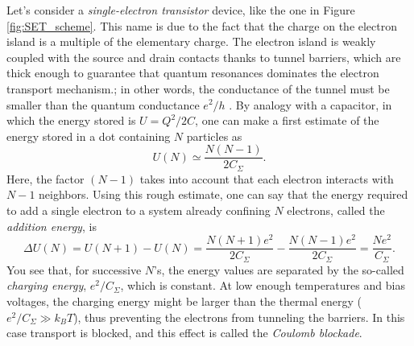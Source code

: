 \documentclass[a4paper,twoside,11pt]{book}
\begin{document}
Let's consider a \emph{single-electron transistor} device, like the one in Figure \ref{fig:SET_scheme}. This name is due to the fact that the charge on the electron island is a multiple of the elementary charge. The electron island is weakly coupled with the source and drain contacts thanks to tunnel barriers, which are thick enough to guarantee that quantum resonances dominates the electron transport mechanism.; in other words, the conductance of the tunnel must be smaller than the quantum conductance $e^2/h$ \citep[see][]{Reimann2002}. By analogy with a capacitor, in which the energy stored is $U=Q^2/2C$, one can make a first estimate of the energy stored in a dot containing $N$ particles as
\begin{equation}
	U(N) \simeq \frac{N(N-1)}{2C_{\Sigma}}.
\end{equation}
Here, the factor $(N-1)$ takes into account that each electron interacts with $N-1$ neighbors. Using this rough estimate, one can say that the energy required to add a single electron to a system already confining $N$ electrons, called the \emph{addition energy}, is
\begin{equation}
	\Delta U (N) = U(N+1)-U(N) = \frac{N(N+1)e^2}{2C_{\Sigma}} - \frac{N(N-1)e^2}{2C_{\Sigma}} = \frac{Ne^2}{C_{\Sigma}}.
\end{equation}
You see that, for successive $N$'s, the energy values are separated by the so-called \emph{charging energy}, $e^2/C_{\Sigma}$, which is constant. At low enough temperatures and bias voltages, the charging energy might be larger than the thermal energy ($e^2/C_{\Sigma} \gg k_BT$), thus preventing the electrons from tunneling the barriers. In this case transport is blocked, and this effect is called the \emph{Coulomb blockade}.
\end{document}

